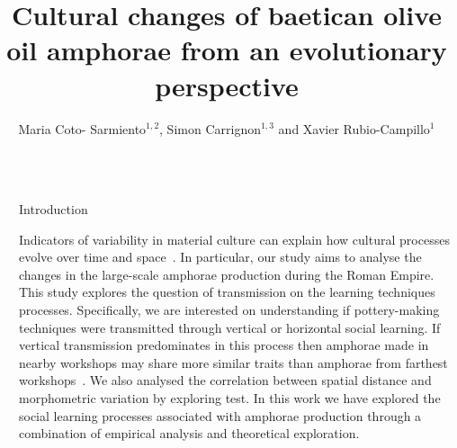 \documentclass[final]{beamer}
\title{Cultural changes of baetican olive oil amphorae from an evolutionary perspective}
\author{Maria Coto- Sarmiento$^{1,2}$, Simon Carrignon$^{1,3}$ and Xavier Rubio-Campillo$^{1}$} %
\institute{$^1$Barcelona Supercomputing Center -- $^2$University of Barcelona -- $^3$Universitat Pompeu Fabra} %
\newlength{\sepwid}
\newlength{\onecolwid}
\begin{document}

\setlength{\belowcaptionskip}{2ex} %
\setlength\belowdisplayshortskip{2ex} %

\begin{frame}[t] %

\vspace{-1cm}

\begin{columns}[t] %

\begin{column}{\sepwid}\end{column} %

\begin{column}{\onecolwid} %


\begin{block}{Introduction}

\justify

Indicators of variability in material culture can explain how cultural processes evolve over time and space~\cite{lipo}. In particular, our study aims to analyse the changes in the large-scale amphorae production during the Roman Empire. This study explores the question of transmission on the learning techniques processes. Specifically, we are interested on understanding if pottery-making techniques were transmitted through vertical or horizontal social learning. If vertical transmission predominates in this process then amphorae made in nearby workshops may share more similar traits than amphorae from farthest workshops~\cite{bjo}. We also analysed the correlation between spatial distance and morphometric variation by exploring test. In this work we have explored the social learning processes associated with amphorae production through a combination of empirical analysis and theoretical exploration.   




\end{block}
\end{column}
\end{columns}
\end{frame}
\end{document}
